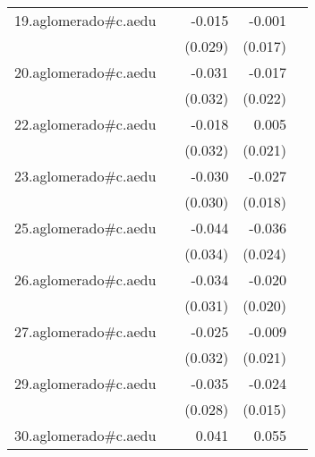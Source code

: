 {\begin{longtable}{l*{4}{D{.}{.}{-1}}}
\addlinespace
19.aglomerado#c.aedu&                     &      -0.015         &      -0.001         &                     \\
            &                     &     (0.029)         &     (0.017)         &                     \\
\addlinespace
20.aglomerado#c.aedu&                     &      -0.031         &      -0.017         &                     \\
            &                     &     (0.032)         &     (0.022)         &                     \\
\addlinespace
22.aglomerado#c.aedu&                     &      -0.018         &       0.005         &                     \\
            &                     &     (0.032)         &     (0.021)         &                     \\
\addlinespace
23.aglomerado#c.aedu&                     &      -0.030         &      -0.027         &                     \\
            &                     &     (0.030)         &     (0.018)         &                     \\
\addlinespace
25.aglomerado#c.aedu&                     &      -0.044         &      -0.036         &                     \\
            &                     &     (0.034)         &     (0.024)         &                     \\
\addlinespace
26.aglomerado#c.aedu&                     &      -0.034         &      -0.020         &                     \\
            &                     &     (0.031)         &     (0.020)         &                     \\
\addlinespace
27.aglomerado#c.aedu&                     &      -0.025         &      -0.009         &                     \\
            &                     &     (0.032)         &     (0.021)         &                     \\
\addlinespace
29.aglomerado#c.aedu&                     &      -0.035         &      -0.024         &                     \\
            &                     &     (0.028)         &     (0.015)         &                     \\
\addlinespace
30.aglomerado#c.aedu&                     &       0.041         &       0.055\sym{**} &                     \\

\end{longtable}}
